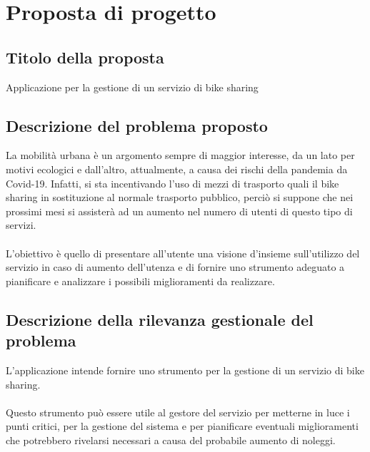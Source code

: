 \documentclass[a4paper, 12pt]{article}
\begin{document}




\tableofcontents

\newpage

\listoffigures

\listoftables

\newpage


\section{Proposta di progetto}
	\subsection{Titolo della proposta}
	Applicazione per la gestione di un servizio di bike sharing
	
	\subsection{Descrizione del problema proposto}
	La mobilità urbana è un argomento sempre di maggior interesse, da un lato per motivi ecologici e dall'altro, attualmente, a causa dei rischi della pandemia da Covid-19. Infatti, si sta 	incentivando l'uso di mezzi di trasporto quali il bike sharing in sostituzione al normale trasporto pubblico, perciò si suppone che nei prossimi mesi si assisterà ad un aumento nel numero di utenti di questo tipo di servizi.\\\\
L'obiettivo è quello di presentare all'utente una visione d'insieme sull'utilizzo del servizio in caso di aumento dell'utenza e di fornire uno strumento adeguato a pianificare e analizzare i possibili miglioramenti da realizzare.

	\subsection{Descrizione della rilevanza gestionale del problema}
	L'applicazione intende fornire uno strumento per la gestione di un servizio di bike sharing.\\\\
Questo strumento può essere utile al gestore del servizio per metterne in luce i punti critici, per la gestione del sistema e per pianificare eventuali miglioramenti che potrebbero rivelarsi necessari a causa del probabile aumento di noleggi.
\end{document}
